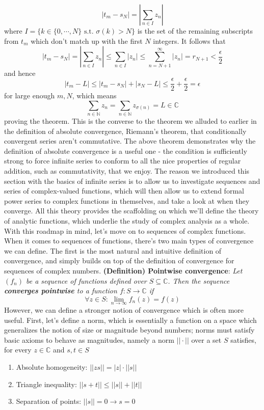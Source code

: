 \documentclass{article}
\newcommand*{\tb}{\textbf}
\newcommand*{\ti}{\textit}
\newcommand*{\n}{\newline}
\newcommand*{\nn}{\newline \newline}
\newcommand*{\N}{\mathbb{N}}
\newcommand*{\C}{\mathbb{C}}
\newcommand*{\st}{\text{ s.t. }}
\begin{document}
    $$ | t_m - s_N | = \left \vert \sum_{n \in I} z_n \right \vert $$
where $ I = \{ k \in \{ 0, \cdots, N \} \st \sigma(k) > N \} $ is the set of the remaining subscripts from $ t_m $ which don't match up with the first $ N $ integers. It follows that
    $$ | t_m - s_N | = \left \vert \sum_{n \in I} z_n \right \vert \leq \sum_{n \in I} | z_n | \leq \sum_{n = N + 1}^\infty | z_n | = r_{N + 1} < \frac{\epsilon}{2} $$
and hence
    $$ | t_m - L | \leq | t_m - s_N | + | s_N - L | \leq \frac{\epsilon}{2} + \frac{\epsilon}{2} = \epsilon $$
for large enough $ m, N $, which means
    $$ \sum_{n \in \N} z_n = \sum_{n \in \N} z_{\sigma(n)} = L \in \C $$
proving the theorem. \qedsymbol
\nn
This is the converse to the theorem we alluded to earlier in the definition of absolute convergence, Riemann's theorem, that conditionally convergent series aren't commutative. The above theorem demonstrates why the definition of absolute convergence is a useful one - the condition is sufficiently strong to force infinite series to conform to all the nice properties of regular addition, such as commutativity, that we enjoy. The reason we introduced this section with the basics of infinite series is to allow us to investigate sequences and series of complex-valued functions, which will then allow us to extend formal power series to complex functions in themselves, and take a look at when they converge. All this theory provides the scaffolding on which we'll define the theory of analytic functions, which underlie the study of complex analysis as a whole. With this roadmap in mind, let's move on to sequences of complex functions.
\n
When it comes to sequences of functions, there's two main types of convergence we can define. The first is the most natural and intuitive definition of convergence, and simply builds on top of the definition of convergence for sequences of complex numbers.
\nn
\tb{(Definition) Pointwise convergence}: \ti{Let $ ( f_n ) $ be a sequence of functions defined over $ S \subseteq \C $. Then the sequence \tb{converges pointwise} to a function $ f: S \rightarrow \C $ if}
    $$ \forall z \in S: \lim_{n \to \infty} f_n(z) = f(z) $$
However, we can define a stronger notion of convergence which is often more useful. First, let's define a norm, which is essentially a function on a space which generalizes the notion of size or magnitude beyond numbers; norms must satisfy basic axioms to behave as magnitudes, namely a norm $ || \cdot || $ over a set $ S $ satisfies, for every $ z \in \C $ and $ s, t \in S $
\begin{enumerate}
    \item Absolute homogeneity: $ || z s || = | z | \cdot || s || $
    \item Triangle inequality: $ || s + t || \leq || s || + || t || $
    \item Separation of points: $ || s || = 0 \rightarrow s = 0 $
\end{enumerate}
\end{document}
